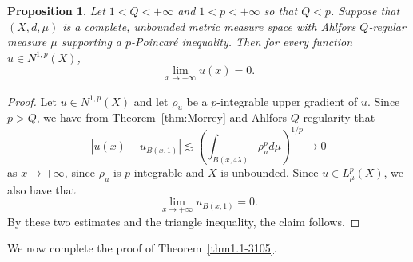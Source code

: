 \documentclass[10pt]{amsart}
\def\Xint#1{\mathchoice
	{\XXint\displaystyle\textstyle{#1}}
	{\XXint\textstyle\scriptstyle{#1}}
	{\XXint\scriptstyle\scriptscriptstyle{#1}}
	{\XXint\scriptscriptstyle\scriptscriptstyle{#1}}
	\!\int}
\def\XXint#1#2#3{{\setbox0=\hbox{$#1{#2#3}{\int}$ }
		\vcenter{\hbox{$#2#3$ }}\kern-.6\wd0}}
\def\dashint{\Xint-}
\newtheorem{proposition}[theorem]{Proposition}
\numberwithin{equation}{section}
\begin{document}
\begin{proposition}\label{thm2.2-07-03}
Let $1<Q<+\infty$ and $1<p<+\infty$ so that $Q<p$. Suppose that $(X,d,\mu)$ is a complete, unbounded metric measure space with Ahlfors $Q$-regular measure $\mu$ supporting a $p$-Poincar\'e inequality. Then for every function $u\in  N^{1,p}(X)$, 
\[
	\lim_{x\to +\infty}u(x)=0.
\]
\end{proposition}
\begin{proof}
Let $u\in N^{1,p}(X)$ and let $\rho_u$ be a $p$-integrable upper gradient of $u$.  Since $p>Q$, we have from Theorem~\ref{thm:Morrey} and Ahlfors $Q$-regularity that 
\[
|u(x)-u_{B(x,1)}|\lesssim\left(\int_{B(x,4\lambda)}\rho_u^pd\mu\right)^{1/p}\to 0
\]
as $x\to+\infty$, since $\rho_u$ is $p$-integrable and $X$ is unbounded.  Since $u\in L^p_\mu(X)$, we also have that 
\[
\lim_{x\to+\infty}u_{B(x,1)}=0.
\]
By these two estimates and the triangle inequality, the claim follows.\qedhere
\end{proof}

We now complete the proof of Theorem~\ref{thm1.1-3105}.
\end{document}
